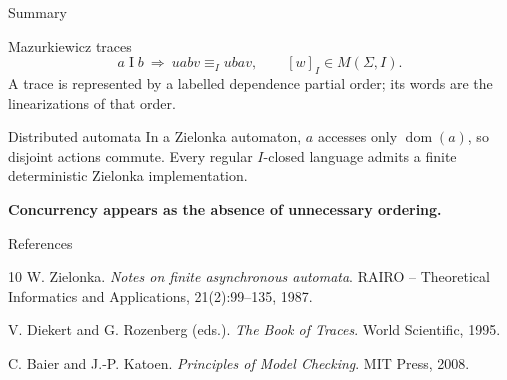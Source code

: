 \documentclass[t,11pt]{beamer}
\newcommand{\domn}{\operatorname{dom}}
\newcommand{\ind}{\mathrel{I}}
\begin{document}
\begin{frame}{Summary}
  \begin{block}{Mazurkiewicz traces}
    \[
       a\ind b\ \Longrightarrow\ uabv\equiv_Iubav,
       \qquad [w]_I\in M(\Sigma,I).
    \]
    A trace is represented by a labelled dependence partial order; its words are the linearizations of that order.
  \end{block}
  \begin{block}{Distributed automata}
    In a Zielonka automaton, $a$ accesses only $\domn(a)$, so disjoint actions commute. Every regular $I$-closed language admits a finite deterministic Zielonka implementation.
  \end{block}
  \vspace{0.1cm}
  \centering\textbf{Concurrency appears as the absence of unnecessary ordering.}
\end{frame}

\begin{frame}{References}
  \begin{thebibliography}{10}
    W. Zielonka.
    \newblock \emph{Notes on finite asynchronous automata}.
    \newblock RAIRO -- Theoretical Informatics and Applications, 21(2):99--135, 1987.

    V. Diekert and G. Rozenberg (eds.).
    \newblock \emph{The Book of Traces}.
    \newblock World Scientific, 1995.

    C. Baier and J.-P. Katoen.
    \newblock \emph{Principles of Model Checking}.
    \newblock MIT Press, 2008.
  \end{thebibliography}
\end{frame}
\end{document}
